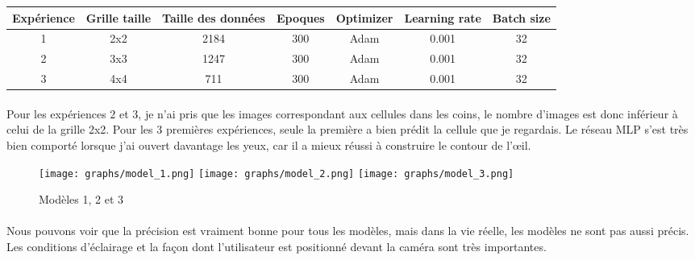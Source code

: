 \begin{center}
    \begin{tabular}{ c | c | c | c | c | c | c }
        \hline
        Expérience & Grille taille & Taille des données & Epoques & Optimizer & Learning rate & Batch size \\ 
        \hline
        1 & 2x2 & 2184 & 300 & Adam & 0.001 & 32 \\
        \hline
        2 & 3x3 & 1247 & 300 & Adam & 0.001 & 32 \\
        \hline
        3 & 4x4 & 711 & 300 & Adam & 0.001 & 32 \\
        \hline
    \end{tabular}
\end{center}

\paragraph{}
Pour les expériences $2$ et $3$, je n'ai pris que les images correspondant aux cellules dans les coins, le nombre d'images est donc inférieur à celui de la grille 2x2.
Pour les 3 premières expériences, seule la première a bien prédit la cellule que je regardais.
Le réseau MLP s'est très bien comporté lorsque j'ai ouvert davantage les yeux, car il a mieux réussi à construire le contour de l'œil.


\begin{figure}[H]
    \centering
    \texttt{[image: graphs/model\_1.png]}
    \texttt{[image: graphs/model\_2.png]}
    \texttt{[image: graphs/model\_3.png]}
    \caption{Modèles 1, 2 et 3}
\end{figure}

\paragraph{}
Nous pouvons voir que la précision est vraiment bonne pour tous les modèles, mais dans la vie réelle, les modèles ne sont pas aussi précis.
Les conditions d'éclairage et la façon dont l'utilisateur est positionné devant la caméra sont très importantes.

